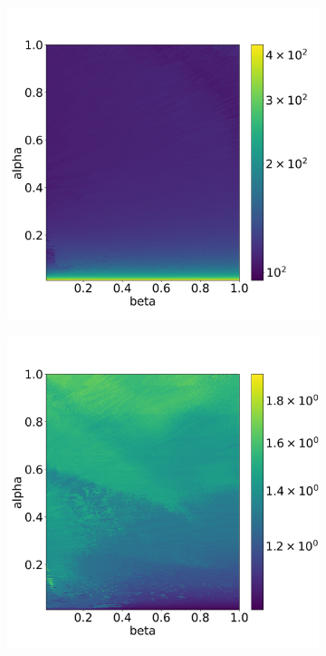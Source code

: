 \begin{figure}[H]
    \centering
    \begin{subfigure}{0.32\textwidth}
    	\centering
    	\includegraphics[width=1\textwidth]{images/analysis_RKF45_TS.png}
        \label{fig:numberTimeStepsRKF45}
    \end{subfigure}
    \begin{subfigure}{0.32\textwidth}
    	\centering
    	\includegraphics[width=1\textwidth]{images/analysis_RKF45_NI.png}

\end{subfigure}
\end{figure}
